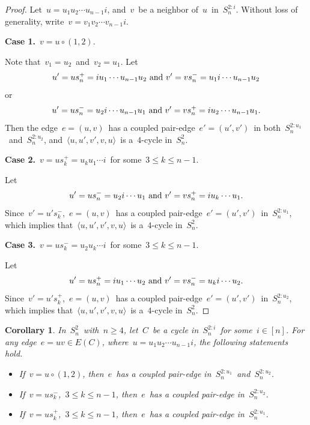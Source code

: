 \documentclass[12pt,a4paper]{amsart}
\newtheorem{cor}[thm]{Corollary}
\theoremstyle{definition}
\begin{document}
	\begin{proof}
	Let~$u=u_1u_2\cdots u_{n-1}i$, and~$v$~be a neighbor of~$u$~in~$S_n^{2:i}$.
	Without loss of generality, write~$v=v_1v_2\cdots v_{n-1}i$.
	
	\medskip
	\noindent\textbf{Case 1.}~$v=u\circ(1,2)$.

    Note that~$v_1=u_2$~and~$v_2=u_1$.
	Let\[u' = u s_n^{+} =iu_1\cdots u_{n-1}u_2~{\rm and}~v' = v s_n^{-} = u_1i\cdots u_{n-1}u_2\]
	or\[u' = u s_n^{-} = u_2i\cdots u_{n-1}u_1~{\rm and}~v' = v s_n^{+} =iu_2\cdots u_{n-1}u_1.
	\]
	Then the edge~$e=(u,v)$~has a coupled pair-edge~$e'=(u',v')$~in both~$S_n^{2:u_1}$~and~$S_n^{2:u_2}$,
	and~$\langle u,u',v',v,u\rangle$~is a~$4$-cycle in~$S_n^2$.
	
	\medskip
	\noindent\textbf{Case 2.}~$v=us_k^{+}=u_k u_1\cdots i$~for some~$3\le k\le n-1$.
	
	Let
	\[
	u' = u s_n^{-} = u_2i\cdots u_1~{\rm and}~v' = vs_n^{+} =iu_k\cdots u_1.
	\]
	Since~$v'=u's_k^{-}$,~$e=(u,v)$~has a coupled pair-edge~$e'=(u',v')$~in~$S_n^{2:u_1}$, which implies that~$\langle u,u',v',v,u\rangle$~is a~$4$-cycle in~$S_n^2$.
	
	\medskip
	\noindent\textbf{Case 3.}~$v=us_k^{-}=u_2u_k\cdots i$~for some~$3\le k\le n-1$.
	
	Let
	\[
	u' = u s_n^{+} = iu_1\cdots u_2~{\rm and}~v' = vs_n^{-} =u_ki\cdots u_2.
	\]
	Since~$v'=u's_k^{+}$,~$e=(u,v)$~has a coupled pair-edge~$e'=(u',v')$~in~$S_n^{2:u_2}$, which implies that~$\langle u,u',v',v,u\rangle$~is a~$4$-cycle in~$S_n^2$.
	\end{proof}
	
	
	\begin{cor}\label{9}
		In~$S_n^2$~with~$n\ge4$, let~$C$~be a cycle in~$S_n^{2:i}$~for some~$i\in[n]$.
		For any edge~$e=uv\in E(C)$, where~$u=u_1u_2\cdots u_{n-1}i$, the following statements hold.
		\begin{itemize}
			\item[(i)] If~$v=u\circ(1,2)$, then~$e$~has a coupled pair-edge in~$S_n^{2:u_1}$~and~$S_n^{2:u_2}$.
			
			\item[(ii)] If~$v=us_k^{-}$,~$3\le k\le n-1$, then~$e$~has a coupled pair-edge in~$S_n^{2:u_2}$.
			
			\item[(iii)] If~$v=us_k^{+}$,~$3\le k\le n-1$, then~$e$~has a coupled pair-edge in~$S_n^{2:u_1}$.
		\end{itemize}
	\end{cor}
	
\end{document}
